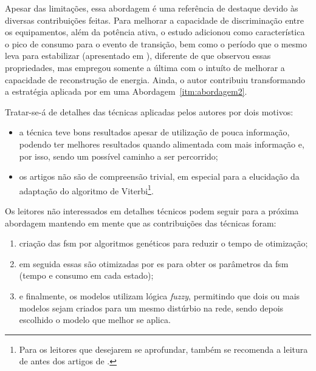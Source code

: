 \begin{enumerate}[label=\textbf{1.\arabic*},wide=\parindent]
\begin{enumerate}[label*=.\textbf{\arabic*},wide=\parindent]
\begin{itemize}[wide=\parindent]
Apesar das limitações, essa abordagem é uma referência de destaque
devido às diversas contribuições feitas. Para melhorar a capacidade de
discriminação entre os equipamentos, além da potência ativa, o estudo
adicionou como característica o pico de consumo para o evento de
transição, bem como o período que o mesmo leva para estabilizar
(apresentado em \cite{nilm_baranski_genetic_detalhado_2004_20}),
diferente de \cite{nilm_cole_data_extraction_1998_14,
nilm_cole_extra_info_surge_1998_15} que observou essas propriedades,
mas empregou somente a última com o intuíto de melhorar a
capacidade de reconstrução de energia. Ainda, o autor contribuiu
transformando a estratégia aplicada por
\citeauthor*{nilm_hart_1992_8} em uma Abordagem~\ref{itm:abordagem2}.

Tratar-se-á de detalhes das técnicas aplicadas pelos autores por dois
motivos:

\begin{itemize}
\item a técnica teve bons resultados apesar de utilização de pouca
informação, podendo ter melhores resultados quando alimentada com mais
informação e, por isso, sendo um possível caminho a ser percorrido;
\item os artigos não são de compreensão trivial, em especial para a
elucidação da adaptação do algoritmo de Viterbi\footnote{Para os
leitores que desejarem se aprofundar, também se recomenda a leitura de
\cite{nilm_bergman_distribuido_2011} antes dos artigos de
\citeauthor*{nilm_baranski_genetic_detalhado_2004_20}.}. 
\end{itemize}

Os leitores não interessados em detalhes técnicos podem
seguir para a próxima abordagem mantendo em mente que as contribuições
das técnicas foram: 

\begin{enumerate}
\item criação das \gls{fsm} por algoritmos genéticos
para reduzir o tempo de otimização; 
\item em seguida essas são otimizadas por \gls{es} para obter os
parâmetros da \gls{fsm} (tempo e consumo em cada estado); 
\item e finalmente, os modelos utilizam lógica \emph{fuzzy}, permitindo que
dois ou mais modelos sejam criados para um mesmo distúrbio na rede,
sendo depois escolhido o modelo que melhor se aplica.
\end{enumerate}


\end{itemize}
\end{enumerate}
\end{enumerate}
